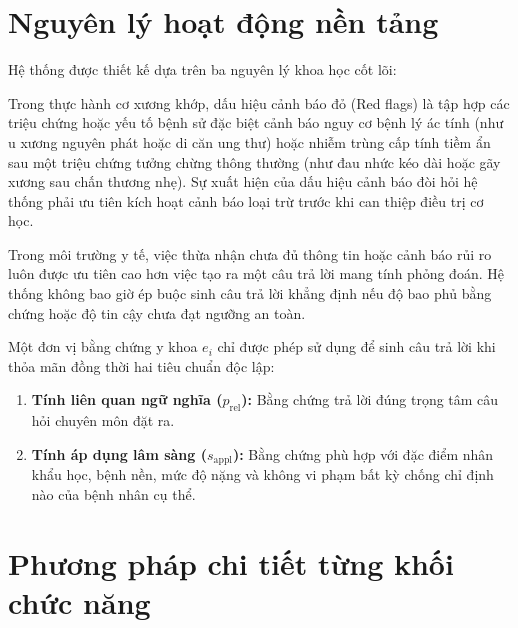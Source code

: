 \section{Nguyên lý hoạt động nền tảng}
Hệ thống được thiết kế dựa trên ba nguyên lý khoa học cốt lõi:

\begin{definition}
Trong thực hành cơ xương khớp, dấu hiệu cảnh báo đỏ (Red flags) là tập hợp các triệu chứng hoặc yếu tố bệnh sử đặc biệt cảnh báo nguy cơ bệnh lý ác tính (như u xương nguyên phát hoặc di căn ung thư) hoặc nhiễm trùng cấp tính tiềm ẩn sau một triệu chứng tưởng chừng thông thường (như đau nhức kéo dài hoặc gãy xương sau chấn thương nhẹ). Sự xuất hiện của dấu hiệu cảnh báo đòi hỏi hệ thống phải ưu tiên kích hoạt cảnh báo loại trừ trước khi can thiệp điều trị cơ học.
\end{definition}

\begin{definition}
Trong môi trường y tế, việc thừa nhận chưa đủ thông tin hoặc cảnh báo rủi ro luôn được ưu tiên cao hơn việc tạo ra một câu trả lời mang tính phỏng đoán. Hệ thống không bao giờ ép buộc sinh câu trả lời khẳng định nếu độ bao phủ bằng chứng hoặc độ tin cậy chưa đạt ngưỡng an toàn.
\end{definition}

\begin{definition}
Một đơn vị bằng chứng y khoa $e_i$ chỉ được phép sử dụng để sinh câu trả lời khi thỏa mãn đồng thời hai tiêu chuẩn độc lập:
\begin{enumerate}
    \item \textbf{Tính liên quan ngữ nghĩa ($p_{\mathrm{rel}}$):} Bằng chứng trả lời đúng trọng tâm câu hỏi chuyên môn đặt ra.
    \item \textbf{Tính áp dụng lâm sàng ($s_{\mathrm{appl}}$):} Bằng chứng phù hợp với đặc điểm nhân khẩu học, bệnh nền, mức độ nặng và không vi phạm bất kỳ chống chỉ định nào của bệnh nhân cụ thể.
\end{enumerate}
\end{definition}

\section{Phương pháp chi tiết từng khối chức năng}

